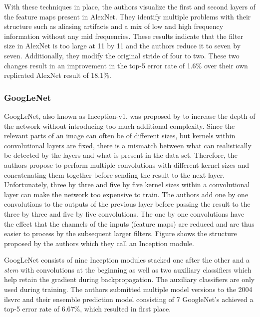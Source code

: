 \documentclass[draft,final]{vutinfth} %
\begin{document}
With these techniques in place, the authors visualize the first and
second layers of the feature maps present in AlexNet. They identify
multiple problems with their structure such as aliasing artifacts and
a mix of low and high frequency information without any mid
frequencies. These results indicate that the filter size in AlexNet is
too large at 11 by 11 and the authors reduce it to seven by
seven. Additionally, they modify the original stride of four to
two. These two changes result in an improvement in the top-5 error
rate of 1.6\% over their own replicated AlexNet result of 18.1\%.

\subsubsection{GoogLeNet}
\label{sssec:theory-googlenet}

GoogLeNet, also known as Inception-v1, was proposed by
\textcite{szegedy2015} to increase the depth of the network without
introducing too much additional complexity. Since the relevant parts
of an image can often be of different sizes, but kernels within
convolutional layers are fixed, there is a mismatch between what can
realistically be detected by the layers and what is present in the
data set. Therefore, the authors propose to perform multiple
convolutions with different kernel sizes and concatenating them
together before sending the result to the next layer. Unfortunately,
three by three and five by five kernel sizes within a convolutional
layer can make the network too expensive to train. The authors add one
by one convolutions to the outputs of the previous layer before
passing the result to the three by three and five by five
convolutions. The one by one convolutions have the effect that the
channels of the inputs (feature maps) are reduced and are thus easier
to process by the subsequent larger filters. Figure  shows the
structure proposed by the authors which they call an Inception module.

GoogLeNet consists of nine Inception modules stacked one after the
other and a \emph{stem} with convolutions at the beginning as well as
two auxiliary classifiers which help retain the gradient during
backpropagation. The auxiliary classifiers are only used during
training. The authors submitted multiple model versions to the 2004
\gls{ilsvrc} and their ensemble prediction model consisting of 7
GoogleNet's achieved a top-5 error rate of 6.67\%, which resulted in
first place.
\end{document}
